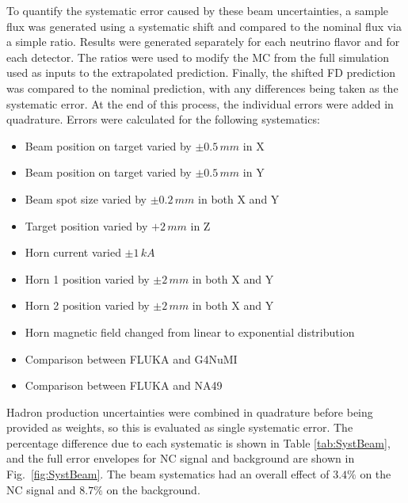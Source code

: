 To quantify the systematic error caused by these beam uncertainties, a sample flux was generated using a systematic shift and compared to the nominal flux via a simple ratio. Results were generated separately for each neutrino flavor and for each detector. The ratios were used to modify the MC from the full simulation used as inputs to the extrapolated prediction. Finally, the shifted FD prediction was compared to the nominal prediction, with any differences being taken as the systematic error. At the end of this process, the individual errors were added in quadrature. Errors were calculated for the following systematics:
\begin{itemize}
  \item Beam position on target varied by $\pm 0.5\,mm$ in X
  \item Beam position on target varied by $\pm 0.5\,mm$ in Y
  \item Beam spot size varied by $\pm 0.2\,mm$ in both X and Y
  \item Target position varied by $+ 2\, mm$ in Z
  \item Horn current varied $\pm 1\,kA$
  \item Horn 1 position varied by $\pm 2\,mm$ in both X and Y
  \item Horn 2 position varied by $\pm 2\,mm$ in both X and Y
  \item Horn magnetic field changed from linear to exponential distribution
  \item Comparison between FLUKA and G4NuMI
  \item Comparison between FLUKA and NA49
\end{itemize}
\n Hadron production uncertainties were combined in quadrature before being provided as weights, so this is evaluated as single systematic error. The percentage difference due to each systematic is shown in Table \ref{tab:SystBeam}, and the full error envelopes for NC signal and background are shown in Fig.~\ref{fig:SystBeam}. The beam systematics had an overall effect of $3.4\%$ on the NC signal and $8.7\%$ on the background.
